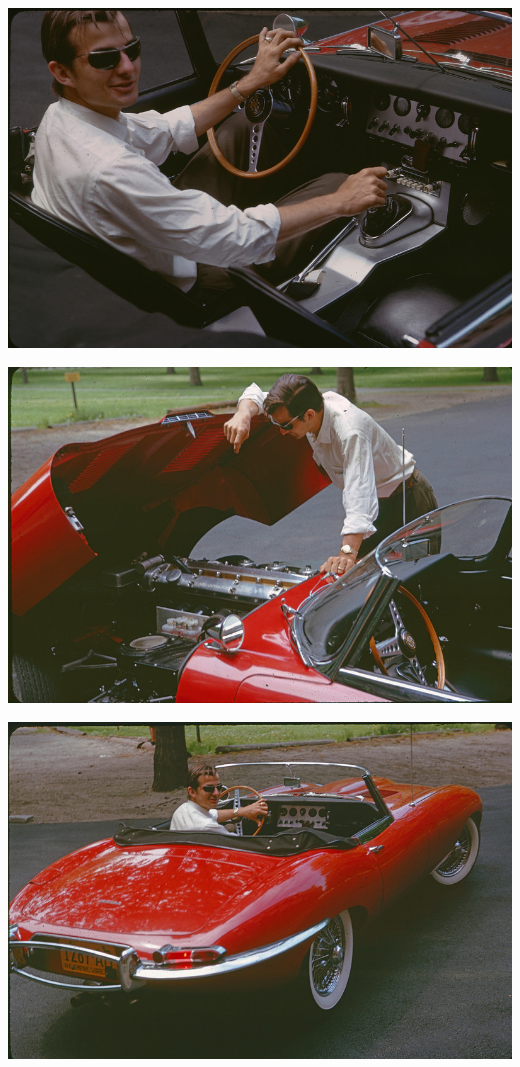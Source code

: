 \documentclass[letterpaper,twoside,preprintnumbers,slac_one]{revtex4}
\begin{document}
\begin{flushleft}
  \includegraphics[scale=25.1]{shift.jpg}
\end{flushleft}

\begin{center}
  \includegraphics[scale=25.1]{hood.jpg}
\end{center}

\begin{flushright}
  \includegraphics[scale=25.1]{byebye.jpg}
\end{flushright}
\end{document}
